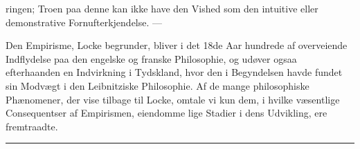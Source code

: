 \documentclass[12pt,a4paper]{book}
\newcommand{\divrule}{\begin{center}\rule{2cm}{0.4pt}\end{center}}
\begin{document}
%
%
ringen; Troen paa denne kan ikke have den Vished som den
intuitive eller demonstrative Fornufterkjendelse. ---

Den Empirisme, Locke begrunder, bliver i det 18de Aar\-%
hundrede af overveiende Indflydelse paa den engelske og franske
Philosophie, og udøver ogsaa efterhaanden en Indvirkning i
Tydskland, hvor den i Begyndelsen havde fundet sin Modvægt
i den Leibnitziske Philosophie. Af de mange philosophiske
Phænomener, der vise tilbage til Locke, omtale vi kun dem,
i hvilke væsentlige Consequentser af Empirismen, eiendomme\-%
lige Stadier i dens Udvikling, ere fremtraadte.

\divrule
%
\end{document}
